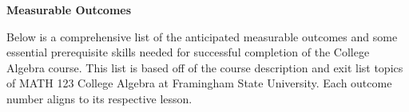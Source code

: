 \documentclass[12pt]{article}
\theoremstyle{definition}
\begin{document}
{\bf \large Measurable Outcomes}
\hfill \doclicenseImage[imagewidth=5em]\\
\par
Below is a comprehensive list of the anticipated measurable outcomes and some essential prerequisite skills needed for successful completion of the College Algebra course.  This list is based off of the course description and exit list topics of MATH 123 College Algebra at Framingham State University.  Each outcome number aligns to its respective lesson.
\end{document}
